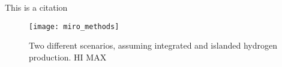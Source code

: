 \lipsum[1]
This is a citation \cite{Schumm2018}


\begin{figure}[h!]
    \centering
    \texttt{[image: miro\_methods]}
    \caption{Two different scenarios, assuming integrated and islanded hydrogen production. HI MAX}
\end{figure}


